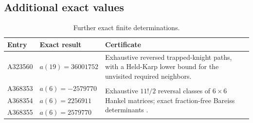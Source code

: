 \subsection{Additional exact values}

\begin{table}[htbp]
\centering
\small
\begin{tabularx}{\textwidth}{@{}l l X@{}}
\toprule
Entry & Exact result & Certificate \\
\midrule
A323560 & \(a(19)=36001752\) & Exhaustive reversed trapped-knight paths, with a Held-Karp lower bound for the unvisited required neighbors. \\
A368353 & \(a(6)=-2579770\) & \multirow{3}{=}{Exhaustive \(11!/2\) reversal classes of \(6\times6\) Hankel matrices; exact fraction-free Bareiss determinants \citep{Bareiss1968}.} \\
A368354 & \(a(6)=2256911\) & \\
A368355 & \(a(6)=2579770\) & \\
\bottomrule
\end{tabularx}
\caption{Further exact finite determinations.}
\label{tab:additional-exact}
\end{table}
